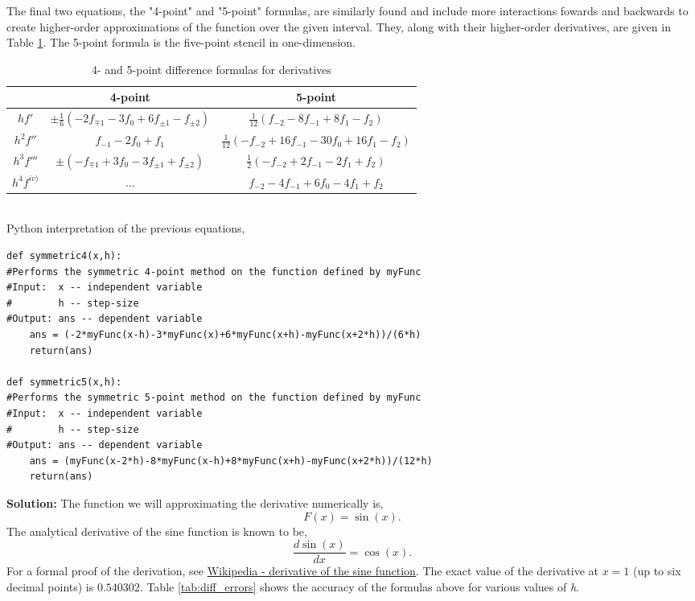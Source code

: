 \documentclass[10pt]{article}
\begin{document}
The final two equations, the "4-point" and "5-point" formulas, are similarly found and include more interactions fowards and backwards to create higher-order approximations of the function over the given interval. They, along with their higher-order derivatives, are given in Table \ref{tab:differentiation}. The 5-point formula is the five-point stencil in one-dimension. \\
\begin{table}[!h]
	\begin{center}
	\caption{4- and 5-point difference formulas for derivatives}
		\label{tab:differentiation}
		\begin{tabular}{|ccc|}
		\hline
		& 4-point & 5-point \\
		\hline
		$hf'$ & $\pm\frac{1}{6}(-2f_{\mp1} - 3f_{0} + 6f_{\pm 1} - f_{\pm 2})$ & $\frac{1}{12}(f_{-2} - 8f_{-1} + 8f_{1} -f_{2})$ \\
		$h^{2}f'' $ & $f_{-1} - 2f_{0} + f_{1}$ & $\frac{1}{12}(-f_{-2}+16f_{-1} - 30 f_{0} +16f_{1} -f_{2})$ \\
		$h^{3}f'''$ & $\pm(-f_{\mp 1} + 3 f_{0} - 3 f_{\pm 1} + f_{\pm 2 })$ & $\frac{1}{2}(-f_{-2} + 2f_{-1} - 2f_{1} + f_{2})$ \\
		$h^{4}f^{iv)} $ & ... & $f_{-2} - 4 f_{-1} + 6 f_{0} -4f_{1} + f_{2}$ \\
		\hline
		\end{tabular}
	\end{center}
\end{table} \\
Python interpretation of the previous equations,
\begin{lstlisting}
def symmetric4(x,h):
#Performs the symmetric 4-point method on the function defined by myFunc
#Input:  x -- independent variable
#        h -- step-size
#Output: ans -- dependent variable
    ans = (-2*myFunc(x-h)-3*myFunc(x)+6*myFunc(x+h)-myFunc(x+2*h))/(6*h)
    return(ans)

def symmetric5(x,h):
#Performs the symmetric 5-point method on the function defined by myFunc
#Input:  x -- independent variable
#        h -- step-size
#Output: ans -- dependent variable
    ans = (myFunc(x-2*h)-8*myFunc(x-h)+8*myFunc(x+h)-myFunc(x+2*h))/(12*h)
    return(ans)
\end{lstlisting}
\textbf{Solution:} The function we will approximating the derivative numerically is,
\[
F(x) = \sin(x).
\]
The analytical derivative of the sine function is known to be,
\[
\frac{d \sin(x)}{dx} = \cos(x).
\]
For a formal proof of the derivation, see \href{https://en.wikipedia.org/wiki/Differentiation_of_trigonometric_functions#Derivative_of_the_sine_function}{Wikipedia - derivative of the sine function}. The exact value of the derivative at $x=1$ (up to six decimal points) is $0.540302$. Table \ref{tab:diff_errors} shows the accuracy of the formulas above for various values of \textit{h}. \\
\end{document}
